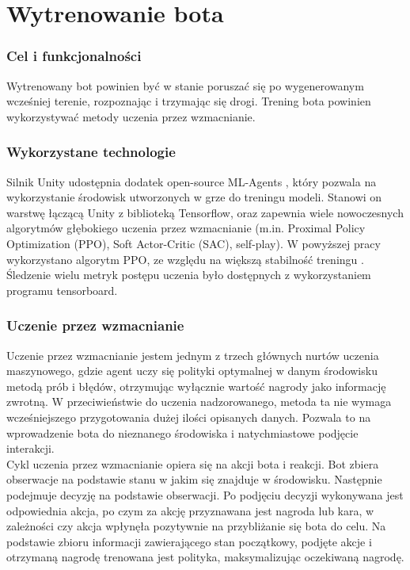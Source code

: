 \chapter{Wytrenowanie bota}
\thispagestyle{chapterBeginStyle}

\subsection{Cel i funkcjonalności}
Wytrenowany bot powinien być w stanie poruszać się po wygenerowanym wcześniej terenie, rozpoznając i trzymając się drogi. Trening bota powinien wykorzystywać metody uczenia przez wzmacnianie.

\subsection{Wykorzystane technologie}
Silnik Unity udostępnia dodatek open-source ML-Agents \cite{UnityMlAgentsRepository} \cite{UnityMlAgents}, który pozwala na wykorzystanie środowisk utworzonych w grze do treningu modeli. Stanowi on warstwę łączącą Unity z biblioteką Tensorflow, oraz zapewnia wiele nowoczesnych algorytmów głębokiego uczenia przez wzmacnianie (m.in. Proximal Policy Optimization (PPO), Soft Actor-Critic (SAC), self-play). W powyższej pracy wykorzystano algorytm PPO, ze względu na większą stabilność treningu \cite{CompareDrlAlgorithms}. Śledzenie wielu metryk postępu uczenia było dostępnych z wykorzystaniem programu tensorboard.

\subsection{Uczenie przez wzmacnianie}
Uczenie przez wzmacnianie jestem jednym z trzech głównych nurtów uczenia maszynowego, gdzie agent uczy się polityki optymalnej w danym środowisku metodą prób i błędów, otrzymując wyłącznie wartość nagrody jako informację zwrotną. W przeciwieństwie do uczenia nadzorowanego, metoda ta nie wymaga wcześniejszego przygotowania dużej ilości opisanych danych. Pozwala to na wprowadzenie bota do nieznanego środowiska i natychmiastowe podjęcie interakcji.\\
Cykl uczenia przez wzmacnianie opiera się na akcji bota i reakcji. Bot zbiera obserwacje na podstawie stanu w jakim się znajduje w środowisku. Następnie podejmuje decyzję na podstawie obserwacji. Po podjęciu decyzji wykonywana jest odpowiednia akcja, po czym za akcję przyznawana jest nagroda lub kara, w zależności czy akcja wpłynęła pozytywnie na przybliżanie się bota do celu. Na podstawie zbioru informacji zawierającego stan początkowy, podjęte akcje i otrzymaną nagrodę trenowana jest polityka, maksymalizując oczekiwaną nagrodę.
\clearpage
